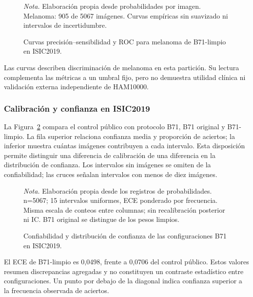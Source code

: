\begin{figure}[!htbp]
\caption{Curvas precisión--sensibilidad y ROC para melanoma de B71-limpio en ISIC2019.}\label{fig:curvas-isic2019}
\centering

\par\smallskip
{\singlespacing\fontsize{11}{13}\selectfont\raggedright
\noindent\textit{Nota.} Elaboración propia desde probabilidades por imagen. Melanoma: 905 de 5067 imágenes. Curvas empíricas sin suavizado ni intervalos de incertidumbre.\par}
\end{figure}
\FloatBarrier
Las curvas describen discriminación de melanoma en esta partición. Su lectura complementa las métricas a un umbral fijo, pero no demuestra utilidad clínica ni validación externa independiente de HAM10000.

\subsubsection{Calibración y confianza en ISIC2019}
La Figura~\ref{fig:calibracion-isic2019} compara el control público con protocolo B71, B71 original y B71-limpio. La fila superior relaciona confianza media y proporción de aciertos; la inferior muestra cuántas imágenes contribuyen a cada intervalo. Esta disposición permite distinguir una diferencia de calibración de una diferencia en la distribución de confianza. Los intervalos sin imágenes se omiten de la confiabilidad; las cruces señalan intervalos con menos de diez imágenes.

\begin{figure}[!htbp]
\caption{Confiabilidad y distribución de confianza de las configuraciones B71 en ISIC2019.}\label{fig:calibracion-isic2019}
\centering

\par\smallskip
{\singlespacing\fontsize{11}{13}\selectfont\raggedright
\noindent\textit{Nota.} Elaboración propia desde los registros de probabilidades. n=5067; 15 intervalos uniformes, ECE ponderado por frecuencia. Misma escala de conteos entre columnas; sin recalibración posterior ni IC. B71 original se distingue de los pesos limpios.\par}
\end{figure}
\FloatBarrier
El ECE de B71-limpio es 0,0498, frente a 0,0706 del control público. Estos valores resumen discrepancias agregadas y no constituyen un contraste estadístico entre configuraciones. Un punto por debajo de la diagonal indica confianza superior a la frecuencia observada de aciertos.

